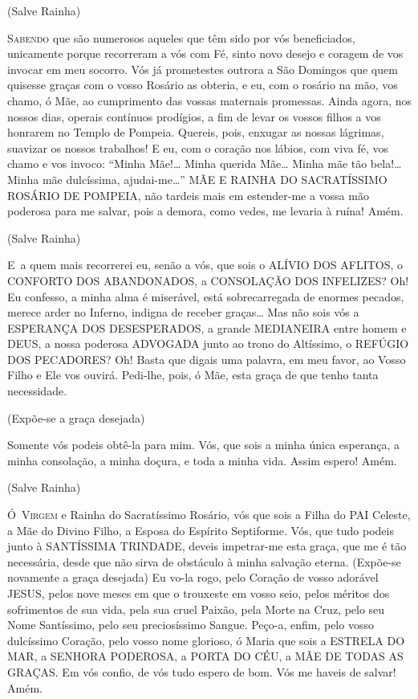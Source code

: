 \documentclass[10pt,twoside,a5paper]{article}
\begin{document}
	(Salve Rainha)
	
	\lettrine{S}{abendo} que são numerosos aqueles que têm sido por vós beneficiados, unicamente porque recorreram a vós com Fé, sinto novo desejo e coragem de vos invocar em meu socorro. Vós já prometestes outrora a São Domingos que quem quisesse graças com o vosso Rosário as obteria, e eu, com o rosário na mão, vos chamo, ó Mãe, ao cumprimento das vossas maternais promessas. Ainda agora, nos nossos dias, operais contínuos prodígios, a fim de levar os vossos filhos a vos honrarem no Templo de Pompeia. Quereis, pois, enxugar as nossas lágrimas, suavizar os nossos trabalhos! E eu, com o coração nos lábios, com viva fé, vos chamo e vos invoco: ``Minha Mãe!… Minha querida Mãe… Minha mãe tão bela!… Minha mãe dulcíssima, ajudai-me…'' MÃE E RAINHA DO SACRATÍSSIMO ROSÁRIO DE POMPEIA, não tardeis mais em estender-me a vossa mão poderosa para me salvar, pois a demora, como vedes, me levaria à ruína! Amém.
	
	(Salve Rainha)
	
	\lettrine{E}\ a quem mais recorrerei eu, senão a vós, que sois o ALÍVIO DOS AFLITOS, o CONFORTO DOS ABANDONADOS, a CONSOLAÇÃO DOS INFELIZES? Oh! Eu confesso, a minha alma é miserável, está sobrecarregada de enormes pecados, merece arder no Inferno, indigna de receber graças… Mas não sois vós a ESPERANÇA DOS DESESPERADOS, a grande MEDIANEIRA entre homem e DEUS, a nossa poderosa ADVOGADA junto ao trono do Altíssimo, o REFÚGIO DOS PECADORES? Oh! Basta que digais uma palavra, em meu favor, ao Vosso Filho e Ele vos ouvirá. Pedi-lhe, pois, ó Mãe, esta graça de que tenho tanta necessidade.
	
	(Expõe-se a graça desejada)
	
	Somente vós podeis obtê-la para mim. Vós, que sois a minha única esperança, a minha consolação, a minha doçura, e toda a minha vida. Assim espero! Amém.
	
	(Salve Rainha)
	
	\lettrine{Ó}{\ Virgem} e Rainha do Sacratíssimo Rosário, vós que sois a Filha do PAI Celeste, a Mãe do Divino Filho, a Esposa do Espírito Septiforme. Vós, que tudo podeis junto à SANTÍSSIMA TRINDADE, deveis impetrar-me esta graça, que me é tão necessária, desde que não sirva de obstáculo à minha salvação eterna. (Expõe-se novamente a graça desejada) Eu vo-la rogo, pelo Coração de vosso adorável JESUS, pelos nove meses em que o trouxeste em vosso seio, pelos méritos dos sofrimentos de sua vida, pela sua cruel Paixão, pela Morte na Cruz, pelo seu Nome Santíssimo, pelo seu preciosíssimo Sangue. Peço-a, enfim, pelo vosso dulcíssimo Coração, pelo vosso nome glorioso, ó Maria que sois a ESTRELA DO MAR, a SENHORA PODEROSA, a PORTA DO CÉU, a MÃE DE TODAS AS GRAÇAS. Em vós confio, de vós tudo espero de bom. Vós me haveis de salvar! Amém.
	
\end{document}
